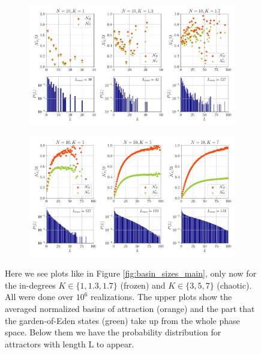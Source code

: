 \begin{figure}[h!]
	\begin{subfigure}{\textwidth}
		\includegraphics[width=\textwidth]{Plots/basin_sizes_N10_frozen}
	\end{subfigure}
	\begin{subfigure}{\textwidth}
		\includegraphics[width=\textwidth]{Plots/basin_sizes_N10_chaotic}
	\end{subfigure}
	\caption{Here we see plots like in Figure \ref{fig:basin_sizes_main}, only now for the in-degrees $K\in \{1,1.3,1.7\}$ (frozen) and $K\in \{3,5,7\}$ (chaotic). All were done over $10^6$ realizations. The upper plots show the averaged normalized basins of attraction (orange) and the part that the garden-of-Eden states (green) take up from the whole phase space. Below them we have the probability distribution for attractors with length L to appear.}
	\label{fig:basin_sizes_main_additional_frozen_chaotic}
\end{figure}
\newpage
\paragraph*{}\paragraph*{}\paragraph*{}
